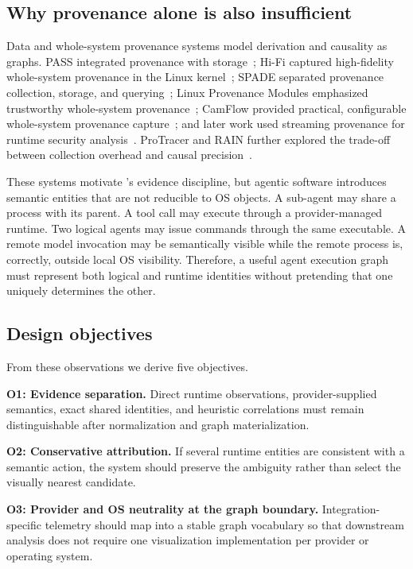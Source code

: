 \subsection{Why provenance alone is also insufficient}
Data and whole-system provenance systems model derivation and causality as graphs. PASS integrated provenance with storage~\cite{muniswamy2006pass}; Hi-Fi captured high-fidelity whole-system provenance in the Linux kernel~\cite{pohly2012hifi}; SPADE separated provenance collection, storage, and querying~\cite{gehani2012spade}; Linux Provenance Modules emphasized trustworthy whole-system provenance~\cite{bates2015lpm}; CamFlow provided practical, configurable whole-system provenance capture~\cite{pasquier2017camflow}; and later work used streaming provenance for runtime security analysis~\cite{pasquier2018runtime}. ProTracer and RAIN further explored the trade-off between collection overhead and causal precision~\cite{ma2016protracer,ji2017rain}.

These systems motivate \system's evidence discipline, but agentic software introduces semantic entities that are not reducible to OS objects. A sub-agent may share a process with its parent. A tool call may execute through a provider-managed runtime. Two logical agents may issue commands through the same executable. A remote model invocation may be semantically visible while the remote process is, correctly, outside local OS visibility. Therefore, a useful agent execution graph must represent both logical and runtime identities without pretending that one uniquely determines the other.

\subsection{Design objectives}
From these observations we derive five objectives.

\textbf{O1: Evidence separation.} Direct runtime observations, provider-supplied semantics, exact shared identities, and heuristic correlations must remain distinguishable after normalization and graph materialization.

\textbf{O2: Conservative attribution.} If several runtime entities are consistent with a semantic action, the system should preserve the ambiguity rather than select the visually nearest candidate.

\textbf{O3: Provider and OS neutrality at the graph boundary.} Integration-specific telemetry should map into a stable graph vocabulary so that downstream analysis does not require one visualization implementation per provider or operating system.

